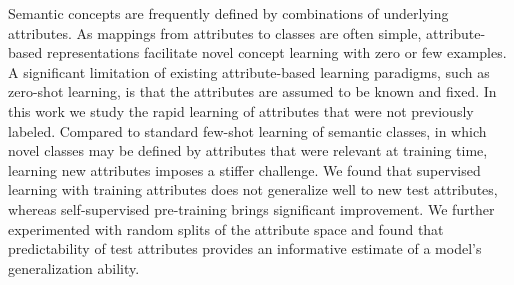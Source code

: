 
\ifarxiv
\vspace{-0.05in}
\fi
Semantic concepts are frequently defined by combinations of underlying
attributes. As mappings from attributes to classes are often simple,
attribute-based representations facilitate novel concept learning with zero or
few examples. A significant limitation of existing attribute-based learning
paradigms, such as zero-shot learning, is that the attributes are assumed to be
known and fixed. In this work we study the rapid learning of attributes that
were not previously labeled. Compared to standard few-shot learning of semantic
classes, in which novel classes may be defined by attributes that were relevant
at training time, learning new attributes imposes a stiffer challenge. We found
that supervised learning with training attributes does not generalize well to
new test attributes, whereas self-supervised pre-training brings significant
improvement. We further experimented with random splits of the attribute space
and found that predictability of test attributes provides an informative
estimate of a model's generalization ability.
